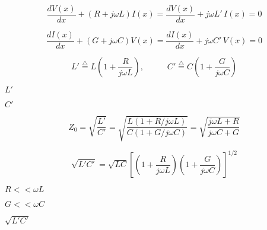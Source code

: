 {\newpage\clearpage
{}%
\begin{displaymath} \frac{dV(x)}{dx}+(R+j\omega L)I(x)=\frac{dV(x)}{dx}+j\omega L'\,I(x)=0 \end{displaymath}%
\lthtmldisplayZ
\lthtmlcheckvsize\clearpage}

{\newpage\clearpage
{}%
\begin{displaymath} \frac{dI(x)}{dx}+(G+j\omega C)V(x)=\frac{dI(x)}{dx}+j\omega C'\,V(x)=0 \end{displaymath}%
\lthtmldisplayZ
\lthtmlcheckvsize\clearpage}

{\newpage\clearpage
{}%
\begin{displaymath}	L'\stackrel{\triangle}{=}L\left(1+\frac{R}{j\omega L}\right),
\;\;\;\;\;\;\;\;\;\;
	C'\stackrel{\triangle}{=}C\left(1+\frac{G}{j\omega C}\right)	\end{displaymath}%
\lthtmldisplayZ
\lthtmlcheckvsize\clearpage}

{\newpage\clearpage
{}%
$L'$%
\lthtmlinlinemathZ
\lthtmlcheckvsize\clearpage}

{\newpage\clearpage
{}%
$C'$%
\lthtmlinlinemathZ
\lthtmlcheckvsize\clearpage}

{\newpage\clearpage
{}%
\begin{displaymath} Z_0=\sqrt{\frac{L'}{C'}}=\sqrt{\frac{L(1+R/j\omega L)}{C(1+G/j\omega C)}}
=\sqrt{\frac{j\omega L+R}{j\omega C+G}} \end{displaymath}%
\lthtmldisplayZ
\lthtmlcheckvsize\clearpage}

{\newpage\clearpage
{}%
\begin{displaymath} \sqrt{L'C'}=\sqrt{LC}\left[ \left(1+\frac{R}{j\omega L}\right)
\left(1+\frac{G}{j\omega C}\right) \right]^{1/2} \end{displaymath}%
\lthtmldisplayZ
\lthtmlcheckvsize\clearpage}

{\newpage\clearpage
{}%
$R<<\omega L$%
\lthtmlinlinemathZ
\lthtmlcheckvsize\clearpage}

{\newpage\clearpage
{}%
$G<<\omega C$%
\lthtmlinlinemathZ
\lthtmlcheckvsize\clearpage}

{\newpage\clearpage
{}%
$\displaystyle \sqrt{L'C'}$%
\lthtmlindisplaymathZ
\lthtmlcheckvsize\clearpage}

